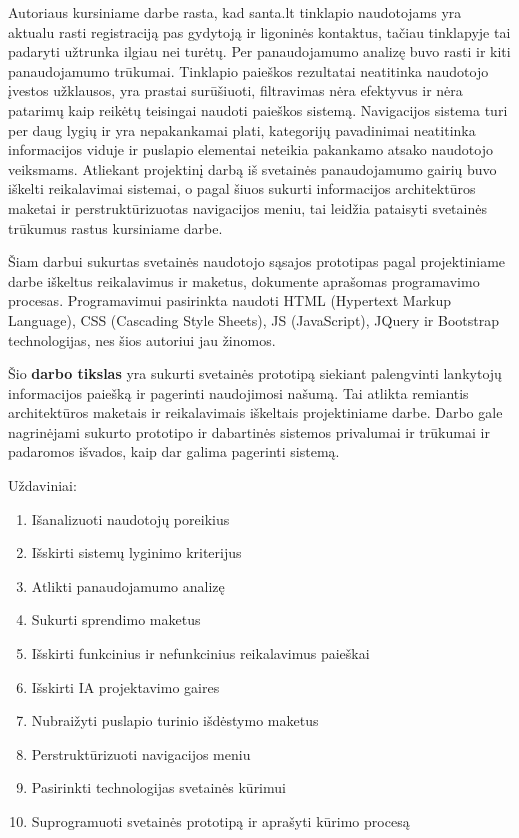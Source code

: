 \documentclass{VUMIFPSbakalaurinis}
\begin{document}
Autoriaus kursiniame darbe rasta, kad santa.lt tinklapio naudotojams yra aktualu rasti registraciją pas gydytoją ir ligoninės kontaktus, tačiau tinklapyje tai padaryti užtrunka ilgiau nei turėtų. Per panaudojamumo analizę buvo rasti ir kiti panaudojamumo trūkumai. Tinklapio paieškos rezultatai neatitinka naudotojo įvestos užklausos, yra prastai surūšiuoti, filtravimas nėra efektyvus ir nėra patarimų kaip reikėtų teisingai naudoti paieškos sistemą. Navigacijos sistema turi per daug lygių ir yra nepakankamai plati, kategorijų pavadinimai neatitinka informacijos viduje ir puslapio elementai neteikia pakankamo atsako naudotojo veiksmams. Atliekant projektinį darbą iš svetainės panaudojamumo gairių buvo iškelti reikalavimai sistemai, o pagal šiuos sukurti informacijos architektūros maketai ir perstruktūrizuotas navigacijos meniu, tai leidžia pataisyti svetainės trūkumus rastus kursiniame darbe.

Šiam darbui sukurtas svetainės naudotojo sąsajos prototipas pagal projektiniame darbe iškeltus reikalavimus ir maketus, dokumente aprašomas programavimo procesas. Programavimui pasirinkta naudoti HTML (Hypertext Markup Language), CSS (Cascading Style Sheets), JS (JavaScript), JQuery ir Bootstrap technologijas, nes šios autoriui jau žinomos.

Šio \textbf{darbo tikslas} yra sukurti svetainės prototipą siekiant palengvinti lankytojų informacijos paiešką ir pagerinti naudojimosi našumą. Tai atlikta remiantis architektūros maketais ir reikalavimais iškeltais projektiniame darbe. Darbo gale nagrinėjami sukurto prototipo ir dabartinės sistemos privalumai ir trūkumai ir padaromos išvados, kaip dar galima pagerinti sistemą.

Uždaviniai:
\begin{enumerate}
	\item Išanalizuoti naudotojų poreikius
	\item Išskirti sistemų lyginimo kriterijus
	\item Atlikti panaudojamumo analizę
	\item Sukurti sprendimo maketus
	\item Išskirti funkcinius ir nefunkcinius reikalavimus paieškai
	\item Išskirti IA projektavimo gaires
	\item Nubraižyti puslapio turinio išdėstymo maketus
	\item Perstruktūrizuoti navigacijos meniu
	\item Pasirinkti technologijas svetainės kūrimui
	\item Suprogramuoti svetainės prototipą ir aprašyti kūrimo procesą
\end{enumerate}
\end{document}
